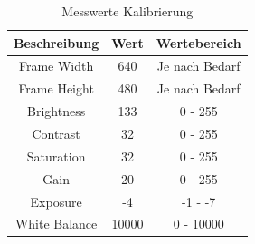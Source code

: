 \documentclass[12pt, oneside, a4paper, \docLanguage]{report}
\begin{document}
\begin{table}[H]
	\centering\small
	\begin{tabular}{|c|c|c|}
		\hline
		\textbf{Beschreibung} & \textbf{Wert} & \textbf{Wertebereich} \\
		\hline
		Frame Width & 640 & Je nach Bedarf  \\
		\hline
		Frame Height & 480 & Je nach Bedarf  \\
		\hline
		Brightness & 133 & 0 - 255  \\
		\hline
		Contrast & 32 & 0 - 255  \\
		\hline
		Saturation & 32 & 0 - 255 \\
		\hline
		Gain & 20 & 0 - 255  \\
		\hline
		Exposure & -4 & -1 - -7 \\
		\hline
		White Balance & 10000 & 0 - 10000  \\
		\hline
	\end{tabular}
	\caption{Messwerte Kalibrierung}
	\label{fig:VERSUCH_1_MESSWERTE_TABELLE}
\end{table}

\newpage
\end{document}
